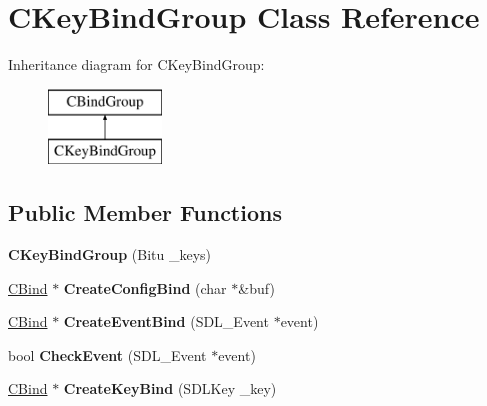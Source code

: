 \hypertarget{classCKeyBindGroup}{\section{C\-Key\-Bind\-Group Class Reference}
\label{classCKeyBindGroup}
}
Inheritance diagram for C\-Key\-Bind\-Group\-:\begin{figure}[H]
\begin{center}
\leavevmode
\includegraphics[height=2.000000cm]{classCKeyBindGroup}
\end{center}
\end{figure}
\subsection*{Public Member Functions}
\begin{DoxyCompactItemize}
\item 
\hypertarget{classCKeyBindGroup_a456c56896883ebe6012542fad2605ac8}{{\bfseries C\-Key\-Bind\-Group} (Bitu \-\_\-keys)}\label{classCKeyBindGroup_a456c56896883ebe6012542fad2605ac8}

\item 
\hypertarget{classCKeyBindGroup_a5bec329665a1a83ee69b539a72f5c20c}{\hyperlink{classCBind}{C\-Bind} $\ast$ {\bfseries Create\-Config\-Bind} (char $\ast$\&buf)}\label{classCKeyBindGroup_a5bec329665a1a83ee69b539a72f5c20c}

\item 
\hypertarget{classCKeyBindGroup_a7719fbf5afe7efc57e3e2ca3f8488949}{\hyperlink{classCBind}{C\-Bind} $\ast$ {\bfseries Create\-Event\-Bind} (S\-D\-L\-\_\-\-Event $\ast$event)}\label{classCKeyBindGroup_a7719fbf5afe7efc57e3e2ca3f8488949}

\item 
\hypertarget{classCKeyBindGroup_a52a9a394010f71d0fb2d2b9d64d9c7ef}{bool {\bfseries Check\-Event} (S\-D\-L\-\_\-\-Event $\ast$event)}\label{classCKeyBindGroup_a52a9a394010f71d0fb2d2b9d64d9c7ef}

\item 
\hypertarget{classCKeyBindGroup_a5ce59d68fbb6d0e79da2ea9c4ffa388a}{\hyperlink{classCBind}{C\-Bind} $\ast$ {\bfseries Create\-Key\-Bind} (S\-D\-L\-Key \-\_\-key)}\label{classCKeyBindGroup_a5ce59d68fbb6d0e79da2ea9c4ffa388a}

\end{DoxyCompactItemize}
